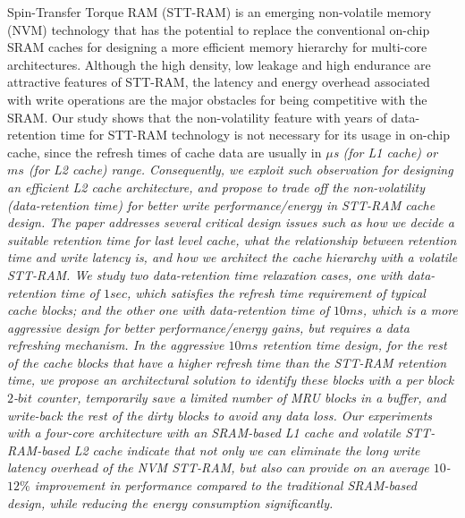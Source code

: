 
Spin-Transfer Torque RAM (STT-RAM) is an emerging non-volatile memory (NVM)
technology that has the potential to replace the conventional
on-chip SRAM caches for designing a more efficient memory hierarchy for
multi-core architectures. Although the high density, low leakage and high endurance are attractive features of STT-RAM,
the latency and energy overhead associated with write operations are the major obstacles for being competitive with the SRAM.
Our study shows that the non-volatility feature with years of data-retention time for STT-RAM technology is not necessary for its usage in on-chip cache, since the refresh times of cache data are usually in  \it{$\mu$s} (for L1 cache) or $ms$ (for L2 cache) range. Consequently,  we exploit such observation for designing an efficient L2 cache
architecture, and propose to trade off the non-volatility (data-retention time)
for better write performance/energy in STT-RAM cache design. The paper addresses several critical design issues such as how we decide a suitable retention time for last level cache,
what the relationship between retention time and write latency is,
and how we architect the cache hierarchy with a volatile STT-RAM.
We study two
data-retention time relaxation cases, one with data-retention time of  $1sec$, which satisfies the refresh time requirement of typical cache blocks; and the other one with data-retention time of $10ms$, which is a more aggressive design for better performance/energy gains, but requires a data refreshing mechanism.
In the aggressive $10ms$ retention time design, for the rest of the cache blocks that have a higher refresh time
than the STT-RAM retention time, we propose an architectural solution to identify these blocks
with a per block $2$-$bit$ counter, temporarily save a limited number of MRU blocks in a buffer,
and write-back the rest of the dirty blocks to avoid any data loss.
Our experiments with a four-core architecture with an SRAM-based L1 cache and volatile STT-RAM-based L2 cache
indicate that not only we can eliminate the long write latency overhead of the NVM STT-RAM, but also can provide
on an average $10$-$12\%$ improvement in performance compared to the traditional SRAM-based
design, while reducing the energy consumption significantly.


